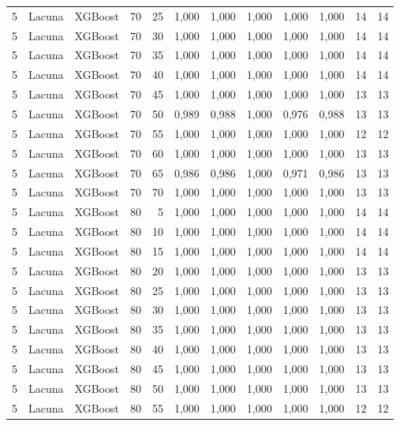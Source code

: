 \begin{longtable}{@{}rllrrrrrrrrr@{}}
5 & Lacuna & XGBoost & 70 & 25 & 1,000 & 1,000 & 1,000 & 1,000 & 1,000 & 14 & 14 \\
5 & Lacuna & XGBoost & 70 & 30 & 1,000 & 1,000 & 1,000 & 1,000 & 1,000 & 14 & 14 \\
5 & Lacuna & XGBoost & 70 & 35 & 1,000 & 1,000 & 1,000 & 1,000 & 1,000 & 14 & 14 \\
5 & Lacuna & XGBoost & 70 & 40 & 1,000 & 1,000 & 1,000 & 1,000 & 1,000 & 14 & 14 \\
5 & Lacuna & XGBoost & 70 & 45 & 1,000 & 1,000 & 1,000 & 1,000 & 1,000 & 13 & 13 \\
5 & Lacuna & XGBoost & 70 & 50 & 0,989 & 0,988 & 1,000 & 0,976 & 0,988 & 13 & 13 \\
5 & Lacuna & XGBoost & 70 & 55 & 1,000 & 1,000 & 1,000 & 1,000 & 1,000 & 12 & 12 \\
5 & Lacuna & XGBoost & 70 & 60 & 1,000 & 1,000 & 1,000 & 1,000 & 1,000 & 13 & 13 \\
5 & Lacuna & XGBoost & 70 & 65 & 0,986 & 0,986 & 1,000 & 0,971 & 0,986 & 13 & 13 \\
5 & Lacuna & XGBoost & 70 & 70 & 1,000 & 1,000 & 1,000 & 1,000 & 1,000 & 13 & 13 \\
5 & Lacuna & XGBoost & 80 & 5 & 1,000 & 1,000 & 1,000 & 1,000 & 1,000 & 14 & 14 \\
5 & Lacuna & XGBoost & 80 & 10 & 1,000 & 1,000 & 1,000 & 1,000 & 1,000 & 14 & 14 \\
5 & Lacuna & XGBoost & 80 & 15 & 1,000 & 1,000 & 1,000 & 1,000 & 1,000 & 14 & 14 \\
5 & Lacuna & XGBoost & 80 & 20 & 1,000 & 1,000 & 1,000 & 1,000 & 1,000 & 13 & 13 \\
5 & Lacuna & XGBoost & 80 & 25 & 1,000 & 1,000 & 1,000 & 1,000 & 1,000 & 13 & 13 \\
5 & Lacuna & XGBoost & 80 & 30 & 1,000 & 1,000 & 1,000 & 1,000 & 1,000 & 13 & 13 \\
5 & Lacuna & XGBoost & 80 & 35 & 1,000 & 1,000 & 1,000 & 1,000 & 1,000 & 13 & 13 \\
5 & Lacuna & XGBoost & 80 & 40 & 1,000 & 1,000 & 1,000 & 1,000 & 1,000 & 13 & 13 \\
5 & Lacuna & XGBoost & 80 & 45 & 1,000 & 1,000 & 1,000 & 1,000 & 1,000 & 13 & 13 \\
5 & Lacuna & XGBoost & 80 & 50 & 1,000 & 1,000 & 1,000 & 1,000 & 1,000 & 13 & 13 \\
5 & Lacuna & XGBoost & 80 & 55 & 1,000 & 1,000 & 1,000 & 1,000 & 1,000 & 12 & 12 \\

\end{longtable}
